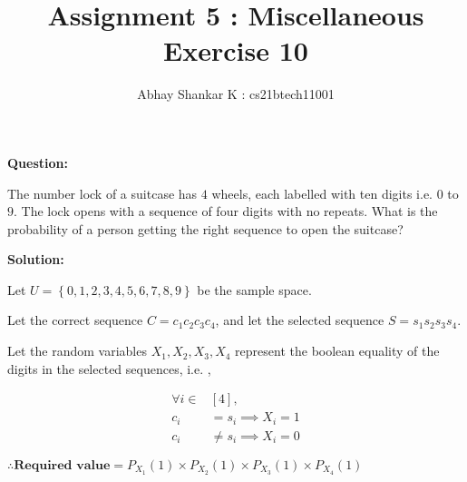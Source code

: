 \documentclass[journal,12pt,twocolumn]{IEEEtran}
\begin{document}
	\title{Assignment 5 : Miscellaneous Exercise 10}
		\author{ Abhay Shankar K : cs21btech11001}

		\maketitle

		\bigskip

	\providecommand{\brak}[1]{\ensuremath{\left(#1\right)}}
	\providecommand{\sbrak}[1]{\ensuremath{\left[#1\right]}}
	\providecommand{\cbrak}[1]{\ensuremath{\left\{#1\right\}}}
	\providecommand{\abs}[1]{\left\vert#1\right\vert}
	\providecommand{\norm}[1]{\left\lVert#1\right\rVert}
	\newcommand{\solution}{\noindent \textbf{Solution: }}
	\newcommand{\question}{\noindent \textbf{Question: }}
	\providecommand{\pr}[2]{\ensuremath{P_{#1}\left(#2\right)}}
	\newcommand*{\permcomb}[4][0mu]{{{}^{#3}\mkern#1#2_{#4}}}
	\newcommand*{\perm}[1][-3mu]{\permcomb[#1]{P}}
	\newcommand*{\comb}[1][-1mu]{\permcomb[#1]{C}}

	\newcommand{\myvec}[1]{\ensuremath{\begin{pmatrix}#1\end{pmatrix}}}
	\let\vec\mathbf


	\question
	
	
	The number lock of a suitcase has $4$ wheels, each labelled with ten digits i.e. $0$ to $9$. The lock opens with a sequence of four digits with no repeats. What is the probability of a person getting the right sequence to open the suitcase?
	
	
	\solution
	
	
	Let $U = \cbrak{0, 1, 2, 3, 4, 5, 6, 7, 8, 9}$ be the sample space.
	
	
	Let the correct sequence $C = c_1 c_2 c_3 c_4$, and let the selected sequence $S = s_1 s_2 s_3 s_4$. 
	
	
	Let the random variables $X_1, X_2, X_3, X_4$ represent the boolean equality of the digits in the selected sequences, i.e. ,
	
	
	\begin{align}
		\forall i \in &\sbrak{4}, \nonumber \\
		c_i &= s_i \implies X_i = 1 \nonumber \\
		c_i &\neq s_i \implies X_i = 0 
			\label{rand}
	\end{align}
	
	
	$\therefore \textbf{Required value}  = \pr{X_1}{1} \times \pr{X_2}{1} \times \pr{X_3}{1} \times \pr{X_4}{1}$
	
\end{document}
